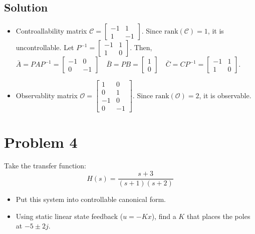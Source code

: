 \documentclass[11pt]{report}
\begin{document}

\subsection*{Solution}
\begin{itemize}
\item Controallability matrix $\mathcal{C} = \begin{bmatrix} -1 & 1 \\1 & -1 \end{bmatrix}$. Since $\text{rank}(\mathcal{C}) = 1$, it is uncontrollable. Let $P^{-1} = \begin{bmatrix} -1 & 1 \\1 & 0 \end{bmatrix}$. Then, $\bar{A} = P A P^{-1} = \begin{bmatrix} -1 & 0 \\ 0 & -1 \end{bmatrix} \quad \bar{B} = PB = \begin{bmatrix} 1 \\ 0 \end{bmatrix} \quad \bar{C} = CP^{-1} = \begin{bmatrix} -1 & 1 \\1 & 0 \end{bmatrix}$.
\item Observablity matrix $\mathcal{O} = \begin{bmatrix} 1 & 0 \\0 & 1\\-1 & 0\\0 & -1 \end{bmatrix}$. Since $\text{rank}(\mathcal{O}) = 2$, it is observable.
\end{itemize}

\pagebreak
\section*{Problem 4}

Take the transfer function:
\[
H(s) = \frac{s+3}{(s+1)(s+2)}
\]
\begin{itemize}
\item Put this system into controllable canonical form.
\item Using static linear state feedback ($u = -Kx$), find a $K$ that places the poles at $-5 \pm 2j$.
\end{itemize}
\end{document}
